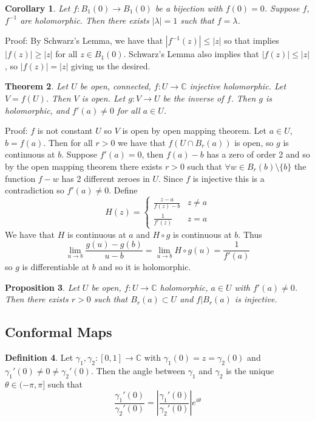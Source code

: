 \documentclass[11pt]{article}
\theoremstyle{plain}
\newtheorem{theorem}{Theorem}[section]
\newtheorem{corollary}[theorem]{Corollary}
\newtheorem{proposition}[theorem]{Proposition}
\theoremstyle{definition}
\newtheorem{definition}[theorem]{Definition}
\newcommand{\C}{\mathbb{C}}
\begin{document}
\begin{corollary}
Let $f: B_1(0) \to B_1(0)$ be a bijection with $f(0) = 0$. Suppose $f$, $f^{-1}$ are holomorphic. Then there exists $|\lambda| = 1$ such that $f = \lambda$.
\end{corollary}

Proof: By Schwarz's Lemma, we have that $|f^{-1}(z)| \leq |z|$ so that implies $|f(z)| \geq |z|$ for all $z \in B_1(0)$. Schwarz's Lemma also implies that $|f(z)| \leq |z|$, so $|f(z)| = |z|$ giving us the desired. 

\begin{theorem}
Let $U$ be open, connected, $f:U \to \C$ injective holomorphic. Let $V = f(U)$. Then $V$ is open. Let $g: V \to U$ be the inverse of $f$. Then $g$ is holomorphic, and $f'(a) \neq 0$ for all $a \in U$.
\end{theorem}

Proof: $f$ is not constant $U$ so $V$ is open by open mapping theorem. Let $a \in U$, $ b = f(a)$. Then for all $r > 0$ we have that $f(U \cap B_r(a))$ is open, so $g$ is continuous at $b$. Suppose $f'(a) = 0$, then $f(a) - b$ has a zero of order 2 and so by the open mapping theorem there exists $r> 0$ such that $\forall w \in B_r(b) \setminus \{ b \}$ the function $f -w $ has 2 different zeroes in $U$. Since $f$ is injective this is a contradiction so $f'(a) \neq 0$. Define 
$$ H(z) = \begin{cases} \frac{z-a}{f(z) - b} & z \neq a \\ \frac{1}{f'(z)} & z = a \end{cases} $$
We have that $H$ is continuous at $a$ and $H \circ g$ is continuous at $b$. Thus 
$$ \lim_{u \to b} \frac{g(u) - g(b)}{u - b} = \lim_{u \to b} H\circ g(u) = \frac{1}{f'(a)} $$
so $g$ is differentiable at $b$ and so it is holomorphic. 

\begin{proposition}
Let $U$ be open, $f: U \to \C$ holomorphic, $a \in U$ with $f'(a) \neq 0$. Then there exists $r > 0$ such that $B_r(a) \subset U$ and $f|B_r(a)$ is injective. 
\end{proposition}

\subsection{Conformal Maps}
\begin{definition}
Let $\gamma_1, \gamma_2:[0,1] \to \C$ with $\gamma_1(0) = z = \gamma_2(0)$ and $\gamma_1'(0) \neq 0 \neq \gamma_2'(0)$. Then the angle between $\gamma_1$ and $\gamma_2$ is the unique $\theta \in (-\pi, \pi]$ such that 
$$ \frac{\gamma_1'(0)}{\gamma_2'(0)} = \left| \frac{\gamma_1'(0)}{\gamma_2'(0)}\right|e^{i\theta} $$
\end{definition}
\end{document}
